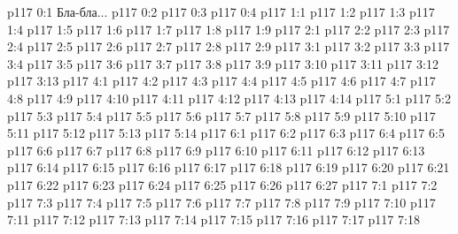 \author{Могущественный Посланник}
\vs p117 0:1  Бла-бла...
\vs p117 0:2 
\vs p117 0:3 
\vs p117 0:4 
\vs p117 1:1 
\vs p117 1:2 \pc 
\vs p117 1:3 
\vs p117 1:4 \pc 
\vs p117 1:5 
\vs p117 1:6 
\vs p117 1:7 \pc 
\vs p117 1:8 
\vs p117 1:9 
\vs p117 2:1 
\vs p117 2:2 
\vs p117 2:3 \pc 
\vs p117 2:4 
\vs p117 2:5 
\vs p117 2:6 \pc 
\vs p117 2:7 
\vs p117 2:8 
\vs p117 2:9 \pc 
{}
\vs p117 3:1 
\vs p117 3:2 
\vs p117 3:3 \pc 
\vs p117 3:4 
\vs p117 3:5 \pc 
\vs p117 3:6 
\vs p117 3:7 
\vs p117 3:8 \pc 
\vs p117 3:9 
\vs p117 3:10 
\vs p117 3:11 \pc 
\vs p117 3:12 
\vs p117 3:13 
\vs p117 4:1 
\vs p117 4:2 
\vs p117 4:3 
\vs p117 4:4 
\vs p117 4:5 
\vs p117 4:6 
\vs p117 4:7 \pc 
\vs p117 4:8 
\vs p117 4:9 
\vs p117 4:10 
\vs p117 4:11 \pc 
\vs p117 4:12 
\vs p117 4:13 
\vs p117 4:14 \pc 
{}
\vs p117 5:1 
\vs p117 5:2 
\vs p117 5:3 \pc 
\vs p117 5:4 
\vs p117 5:5 \pc 
\vs p117 5:6 
\vs p117 5:7 
\vs p117 5:8 
\vs p117 5:9 \pc 
\vs p117 5:10 
\vs p117 5:11 
\vs p117 5:12 
\vs p117 5:13 
\vs p117 5:14 
\vs p117 6:1 
\vs p117 6:2 
\vs p117 6:3 
\vs p117 6:4 \pc 
\vs p117 6:5 
\vs p117 6:6 
\vs p117 6:7 
\vs p117 6:8 
\vs p117 6:9 \pc 
\vs p117 6:10 
\vs p117 6:11 \pc 
\vs p117 6:12 
\vs p117 6:13 
\vs p117 6:14 
\vs p117 6:15 \pc 
\vs p117 6:16 
\vs p117 6:17 
\vs p117 6:18 
\vs p117 6:19 
\vs p117 6:20 
\vs p117 6:21 
\vs p117 6:22 
\vs p117 6:23 
\vs p117 6:24 
\vs p117 6:25 \pc 
\vs p117 6:26 
\vs p117 6:27 
\vs p117 7:1 
\vs p117 7:2 
\vs p117 7:3 
\vs p117 7:4 
\vs p117 7:5 
\vs p117 7:6 \pc 
\vs p117 7:7 \pc 
\vs p117 7:8 \pc 
\vs p117 7:9 
\vs p117 7:10 
\vs p117 7:11 
\vs p117 7:12 \pc 
\vs p117 7:13 
\vs p117 7:14 
\vs p117 7:15 
\vs p117 7:16 
\vs p117 7:17 \pc 
\vsetoff
\vs p117 7:18 
\quizlink

